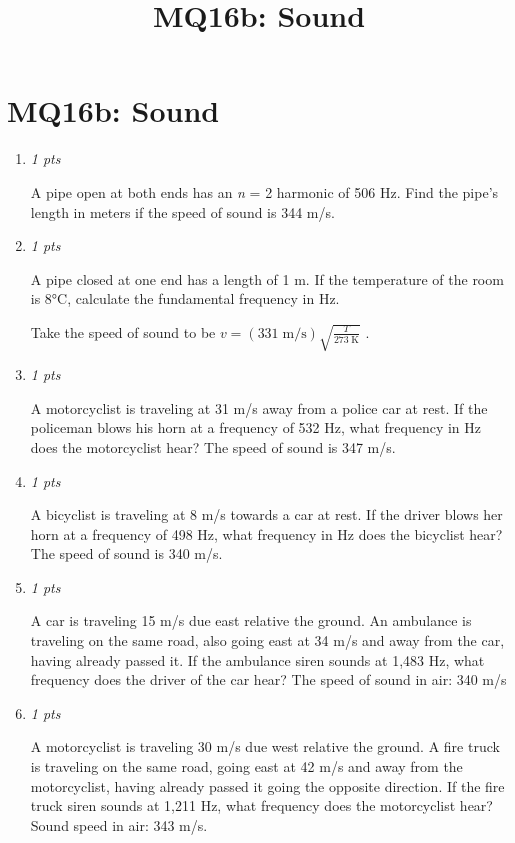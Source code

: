 \documentclass[11pt]{article}
\title{MQ16b: Sound}
\author{}
\date{}
\begin{document}
\maketitle

\section*{MQ16b: Sound}

\begin{enumerate}[leftmargin=*,label=\textbf{Question \arabic*.}]
\item \hfill \textit{1 pts}

A pipe open at both ends has an \emph{n} = 2 harmonic of 506 Hz. Find the pipe's length in meters if the speed of sound is 344 m/s.

\item \hfill \textit{1 pts}

A pipe closed at one end has a length of 1 m. If the temperature of the room is 8°C, calculate the fundamental frequency in Hz.

Take the speed of sound to be $v=(331\;\mathrm{m/s})\sqrt{\frac{T}{273\;\mathrm{K}}}$ .

\item \hfill \textit{1 pts}

A motorcyclist is traveling at 31 m/s away from a police car at rest. If the policeman blows his horn at a frequency of 532 Hz, what frequency in Hz does the motorcyclist hear? The speed of sound is 347 m/s.

\item \hfill \textit{1 pts}

A bicyclist is traveling at 8 m/s towards a car at rest. If the driver blows her horn at a frequency of 498 Hz, what frequency in Hz does the bicyclist hear? The speed of sound is 340 m/s.

\item \hfill \textit{1 pts}

A car is traveling 15 m/s due east relative the ground. An ambulance is traveling on the same road, also going east at 34 m/s and away from the car, having already passed it. If the ambulance siren sounds at 1,483 Hz, what frequency does the driver of the car hear? The speed of sound in air: 340 m/s

\item \hfill \textit{1 pts}

A motorcyclist is traveling 30 m/s due west relative the ground. A fire truck is traveling on the same road, going east at 42 m/s and away from the motorcyclist, having already passed it going the opposite direction. If the fire truck siren sounds at 1,211 Hz, what frequency does the motorcyclist hear? Sound speed in air: 343 m/s.


\end{enumerate}
\end{document}
